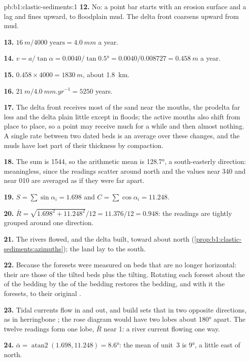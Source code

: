 \begin{solution}{pb:b1:clastic-sediments:1}
\textbf{12.} No: a point bar starts with an erosion surface and a lag and fines
upward, to floodplain mud. The delta front coarsens upward from mud.

\textbf{13.} $\qty{16}{m}/\num{4000}\text{ years} = \qty{4.0}{mm}$ a year.

\textbf{14.} $v = a/\tan\alpha = 0.0040/\tan\ang{0.5} = 0.0040/0.008727 =
\qty{0.458}{m}$ a year.

\textbf{15.} $0.458 \times 4000 = \qty{1830}{m}$, about \qty{1.8}{km}.

\textbf{16.} $\qty{21}{m}/\qty{4.0}{mm.yr^{-1}} = 5250$ years.

\textbf{17.} The delta front receives most of the sand near the mouths, the
prodelta far less and the delta plain little except in floods; the active mouths
also shift from place to place, so a point may receive much for a while and then
almost nothing. A single rate between two dated beds is an average over these
changes, and the muds have lost part of their thickness by compaction.

\textbf{18.} The sum is 1544, so the arithmetic mean is \ang{128.7}, a
south-easterly direction: meaningless, since the readings scatter around north
and the values near 340 and near 010 are averaged as if they were far apart.

\textbf{19.} $S = \sum\sin\alpha_i = 1.698$ and $C = \sum\cos\alpha_i =
11.248$.

\textbf{20.} $\bar R = \sqrt{1.698^2 + 11.248^2}/12 = 11.376/12 = 0.948$: the
readings are tightly grouped around one direction.

\textbf{21.} The rivers flowed, and the delta built, toward about north
(\cref{prop:b1:clastic-sediments:azimuths}); the land lay to the south.

\textbf{22.} Because the foresets were measured on beds that are no longer
horizontal: their  are those of the tilted beds plus the
tilting. Rotating each foreset about the  of the bedding by the  of
the bedding restores the bedding, and with it the foresets, to their original
.

\textbf{23.} Tidal currents flow in and out, and build sets that  in two
opposite directions, as in herringbone ; the rose diagram would
have two lobes about \ang{180} apart. The twelve readings form one lobe,
$\bar R$ near 1: a river current flowing one way.

\textbf{24.} $\bar\alpha = \operatorname{atan2}(1.698, 11.248) = \ang{8.6}$: the
mean   of unit~3 is \ang{9}, a little east of north.
\end{solution}

